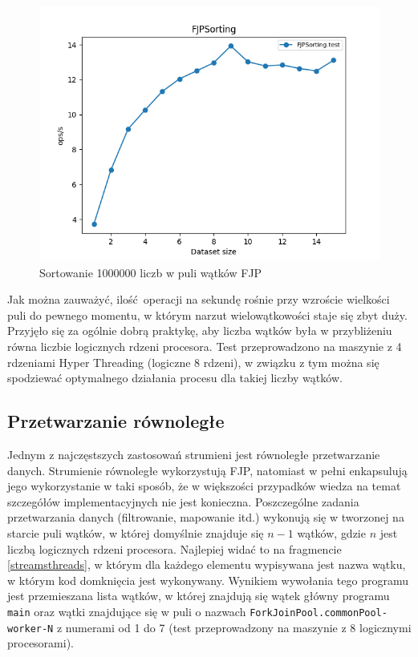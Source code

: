 \documentclass[12pt]{extarticle}
\begin{document}
\begin{figure}[h]
\centering
\includegraphics[width=13cm]{plots/FJPSorting}
\caption{Sortowanie 1000000 liczb w puli wątków FJP}
\label{fig:fjpsorting}
\end{figure}

    Jak można zauważyć, ilość operacji na sekundę rośnie przy wzroście wielkości puli do pewnego momentu, w którym narzut wielowątkowości staje się zbyt duży. Przyjęło się za ogólnie dobrą praktykę, aby liczba wątków była w przybliżeniu równa liczbie logicznych rdzeni procesora. Test przeprowadzono na maszynie z 4 rdzeniami Hyper Threading (logiczne 8 rdzeni), w związku z tym można się spodziewać optymalnego działania procesu dla takiej liczby wątków.




\subsection{Przetwarzanie równoległe}

    Jednym z najczęstszych zastosowań strumieni jest równoległe przetwarzanie danych. Strumienie równoległe wykorzystują FJP, natomiast w pełni enkapsulują jego wykorzystanie w taki sposób, że w większości przypadków wiedza na temat szczegółów implementacyjnych nie jest konieczna. Poszczególne zadania przetwarzania danych (filtrowanie, mapowanie itd.) wykonują się w tworzonej na starcie puli wątków, w której domyślnie znajduje się $ n-1 $ wątków, gdzie $ n $ jest liczbą logicznych rdzeni procesora. Najlepiej widać to na fragmencie \ref{streamsthreads}, w którym dla każdego elementu wypisywana jest nazwa wątku, w którym kod domknięcia jest wykonywany.  Wynikiem wywołania tego programu jest przemieszana lista wątków, w której znajdują się wątek główny programu \texttt{main} oraz wątki znajdujące się w puli o nazwach \texttt{ForkJoinPool.commonPool-worker-N} z numerami od 1 do 7 (test przeprowadzony na maszynie z 8 logicznymi procesorami).
\end{document}
